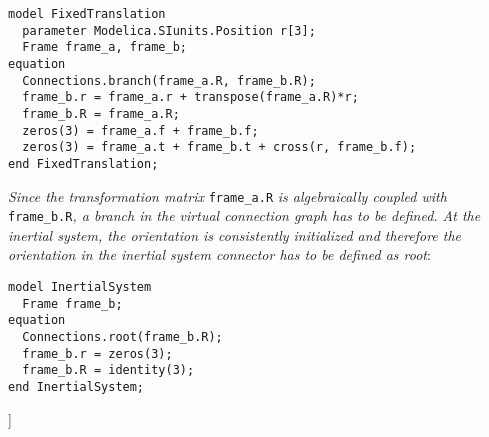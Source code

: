 \begin{lstlisting}[language=modelica]
model FixedTranslation
  parameter Modelica.SIunits.Position r[3];
  Frame frame_a, frame_b;
equation
  Connections.branch(frame_a.R, frame_b.R);
  frame_b.r = frame_a.r + transpose(frame_a.R)*r;
  frame_b.R = frame_a.R;
  zeros(3) = frame_a.f + frame_b.f;
  zeros(3) = frame_a.t + frame_b.t + cross(r, frame_b.f);
end FixedTranslation;
\end{lstlisting}
\emph{Since the transformation matrix} \lstinline!frame_a.R! \emph{is algebraically
coupled with} \lstinline!frame_b.R!\emph{, a branch in the virtual connection graph
has to be defined. At the inertial system, the orientation is
consistently initialized and therefore the orientation in the inertial
system connector has to be defined as root}:

\begin{lstlisting}[language=modelica]
model InertialSystem
  Frame frame_b;
equation
  Connections.root(frame_b.R);
  frame_b.r = zeros(3);
  frame_b.R = identity(3);
end InertialSystem;
\end{lstlisting}
{]}
